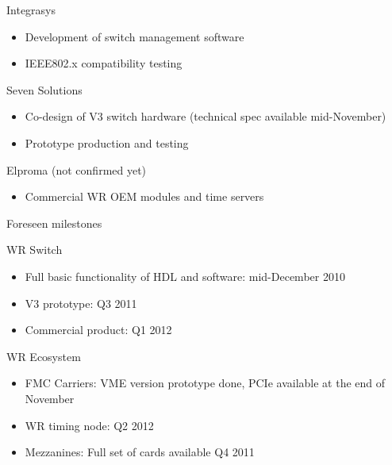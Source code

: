 \documentclass[xcolor=dvipsnames]{beamer}
\begin{document}
\begin{frame}

  \begin{block}{Integrasys}
    \begin{itemize} 
      \item Development of switch management software
      \item IEEE802.x compatibility testing
      \end{itemize}
    \end{block}

  \begin{block}{Seven Solutions}
    \begin{itemize} 
      \item Co-design of V3 switch hardware (technical spec available mid-November)
      \item Prototype production and testing
      \end{itemize}
    \end{block}

  \begin{block}{Elproma (not confirmed yet)}
    \begin{itemize} 
      \item Commercial WR OEM modules and time servers
      \end{itemize}
    \end{block}

\end{frame}

\begin{frame}{Foreseen milestones}

  \begin{block}{WR Switch}
    \begin{itemize} 
      \item Full basic functionality of HDL and software: mid-December 2010
      \item V3 prototype: Q3 2011
      \item Commercial product: Q1 2012
      \end{itemize}
    \end{block}

  \begin{block}{WR Ecosystem}
    \begin{itemize} 
      \item FMC Carriers: VME version prototype done, PCIe available at the end of November
      \item WR timing node: Q2 2012
      \item Mezzanines: Full set of cards available Q4 2011 
      \end{itemize}
    \end{block}

\end{frame}
\end{document}
